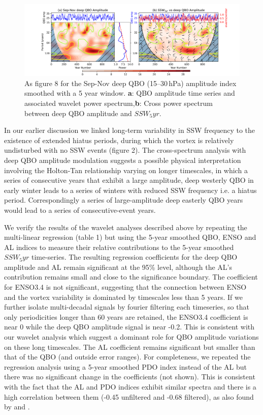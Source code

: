 \documentclass[wcd, manuscript]{copernicus}
\begin{document}
\begin{center}
\begin{figure}[h!]
\includegraphics[width = \textwidth]{new_changed_figures/QBO_deep_amp_wavelet_combined_new_levels.png}
\caption{As figure 8 for the Sep-Nov deep QBO (15--30\,hPa) amplitude index smoothed with a 5 year window. \textbf{a}: QBO amplitude time series and associated wavelet power spectrum,\textbf{b}: Cross power spectrum between deep QBO amplitude and $SSW_5yr$.}
\end{figure}
\end{center}

In our earlier discussion we linked long-term variability in SSW frequency to the existence of extended hiatus periods, during which the vortex is relatively undisturbed with no SSW events (figure 2). The cross-spectrum analysis with deep QBO amplitude modulation suggests a possible physical interpretation involving the Holton-Tan relationship varying on longer timescales, in which a series of consecutive years that exhibit a large amplitude, deep westerly QBO in early winter leads to a series of winters with reduced SSW frequency i.e. a hiatus period. Correspondingly a series of large-amplitude deep easterly QBO years would lead to a series of consecutive-event years.

We verify the results of the wavelet analyses described above by repeating the multi-linear regression (table 1) but using the 5-year smoothed QBO, ENSO and AL indices to measure their  relative contributions to the 5-year smoothed  $SSW_5yr$ time-series. The resulting regression coefficients for the deep QBO amplitude and AL remain significant at the 95\% level, although the AL's contribution remains small and close to the significance boundary. The coefficient for ENSO3.4 is not significant, suggesting that the connection between ENSO and the vortex variability is dominated by timescales less than 5 years. If we further isolate multi-decadal signals by fourier filtering each timeseries, so that only periodicities longer than 60 years are retained, the ENSO3.4 coefficient is near 0 while the deep QBO amplitude signal is near -0.2. This is consistent with our wavelet analysis which suggest a dominant role for QBO amplitude variations on these long timescales. The AL coefficient remains significant but smaller than that of the QBO (and outside error ranges). For completeness, we repeated the regression analysis using a 5-year smoothed PDO index instead of the AL but there was no significant change in the coefficients (not shown). This is consistent with the fact that the AL and PDO indices exhibit similar spectra and there is a high correlation between them (-0.45 unfiltered and -0.68 filtered), as also found by \cite{Mantua_1997} and \cite{Rodionov2005}. 
\end{document}
